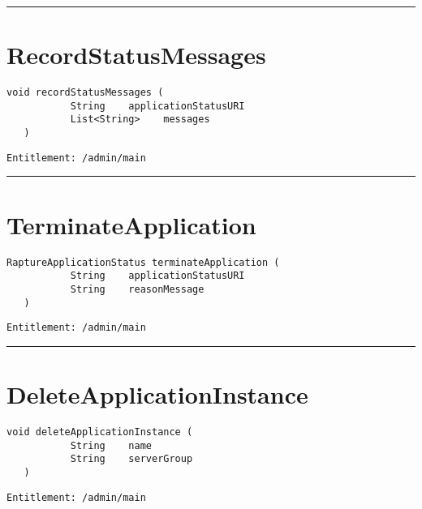 \rule{12cm}{2pt}
\section{RecordStatusMessages}
\label{Api:RecordStatusMessages}
\begin{lstlisting}[style=nonumbers]
   void recordStatusMessages (
           String    applicationStatusURI
           List<String>    messages
   )
\end{lstlisting}
\begin{Verbatim}[formatcom=\color{Maroon}]
  Entitlement: /admin/main
\end{Verbatim}



\rule{12cm}{2pt}
\section{TerminateApplication}
\label{Api:TerminateApplication}
\begin{lstlisting}[style=nonumbers]
   RaptureApplicationStatus terminateApplication (
           String    applicationStatusURI
           String    reasonMessage
   )
\end{lstlisting}
\begin{Verbatim}[formatcom=\color{Maroon}]
  Entitlement: /admin/main
\end{Verbatim}



\rule{12cm}{2pt}
\section{DeleteApplicationInstance}
\label{Api:DeleteApplicationInstance}
\begin{lstlisting}[style=nonumbers]
   void deleteApplicationInstance (
           String    name
           String    serverGroup
   )
\end{lstlisting}
\begin{Verbatim}[formatcom=\color{Maroon}]
  Entitlement: /admin/main
\end{Verbatim}



